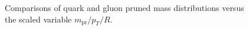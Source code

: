 \begin{figure}
\centering
{}
\caption{Comparisons of quark and gluon pruned mass distributions versus the scaled variable $m_\text{pr}/p_T/R$. }
\label{fig:qg_prmasses_log}
\end{figure}

